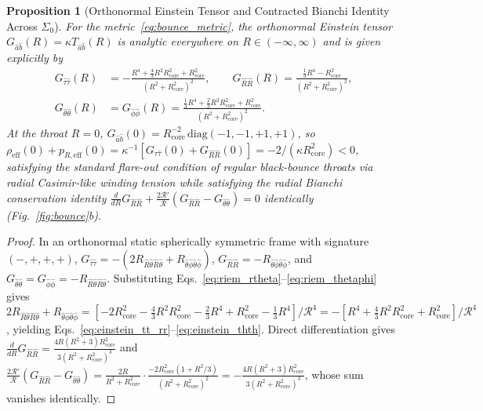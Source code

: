 \documentclass[pdflatex,sn-mathphys-num]{sn-jnl}
\theoremstyle{thmstyleone}
\newtheorem{proposition}[theorem]{Proposition}
\theoremstyle{thmstyletwo}
\theoremstyle{thmstylethree}
\begin{document}
\begin{proposition}[Orthonormal Einstein Tensor and Contracted Bianchi Identity Across $\Sigma_0$]\label{prop:bianchi}
For the metric~\eqref{eq:bounce_metric}, the orthonormal Einstein tensor $G_{\hat{a}\hat{b}}(R) = \kappa T_{\hat{a}\hat{b}}(R)$ is analytic everywhere on $R \in (-\infty,\infty)$ and is given explicitly by
\begin{align}
G_{\hat{\tau}\hat{\tau}}(R) &= -\frac{R^4 + \frac{4}{3}R^2 R_{\mathrm{core}}^2 + R_{\mathrm{core}}^2}{(R^2 + R_{\mathrm{core}}^2)^2}, \qquad
G_{\hat{R}\hat{R}}(R) = \frac{\frac{1}{3}R^4 - R_{\mathrm{core}}^2}{(R^2 + R_{\mathrm{core}}^2)^2}, \label{eq:einstein_tt_rr}\\
G_{\hat{\theta}\hat{\theta}}(R) &= G_{\hat{\phi}\hat{\phi}}(R) = \frac{\frac{1}{3}R^4 + \frac{2}{3}R^2 R_{\mathrm{core}}^2 + R_{\mathrm{core}}^2}{(R^2 + R_{\mathrm{core}}^2)^2}. \label{eq:einstein_thth}
\end{align}
At the throat $R=0$, $G_{\hat{a}\hat{b}}(0) = R_{\mathrm{core}}^{-2}\,\mathrm{diag}(-1, -1, +1, +1)$, so $\rho_{\mathrm{eff}}(0) + p_{R,\mathrm{eff}}(0) = \kappa^{-1}[G_{\hat{\tau}\hat{\tau}}(0) + G_{\hat{R}\hat{R}}(0)] = -2/(\kappa R_{\mathrm{core}}^2) < 0$, satisfying the standard flare-out condition of regular black-bounce throats \cite{MorrisThorne1988,SimpsonVisser2019} via radial Casimir-like winding tension while satisfying the radial Bianchi conservation identity $\frac{d}{dR}G_{\hat{R}\hat{R}} + \frac{2\mathcal{R}'}{\mathcal{R}}(G_{\hat{R}\hat{R}} - G_{\hat{\theta}\hat{\theta}}) = 0$ identically (Fig.~\ref{fig:bounce}b).
\end{proposition}

\begin{proof}
In an orthonormal static spherically symmetric frame with signature $(-,+,+,+)$, $G_{\hat{\tau}\hat{\tau}} = -(2R_{\hat{R}\hat{\theta}\hat{R}\hat{\theta}} + R_{\hat{\theta}\hat{\phi}\hat{\theta}\hat{\phi}})$, $G_{\hat{R}\hat{R}} = -R_{\hat{\theta}\hat{\phi}\hat{\theta}\hat{\phi}}$, and $G_{\hat{\theta}\hat{\theta}} = G_{\hat{\phi}\hat{\phi}} = -R_{\hat{R}\hat{\theta}\hat{R}\hat{\theta}}$. Substituting Eqs.~\eqref{eq:riem_rtheta}--\eqref{eq:riem_thetaphi} gives $2R_{\hat{R}\hat{\theta}\hat{R}\hat{\theta}} + R_{\hat{\theta}\hat{\phi}\hat{\theta}\hat{\phi}} = [-2R_{\mathrm{core}}^2 - \frac{4}{3}R^2 R_{\mathrm{core}}^2 - \frac{2}{3}R^4 + R_{\mathrm{core}}^2 - \frac{1}{3}R^4]/\mathcal{R}^4 = -[R^4 + \frac{4}{3}R^2 R_{\mathrm{core}}^2 + R_{\mathrm{core}}^2]/\mathcal{R}^4$, yielding Eqs.~\eqref{eq:einstein_tt_rr}--\eqref{eq:einstein_thth}. Direct differentiation gives $\frac{d}{dR}G_{\hat{R}\hat{R}} = \frac{4R(R^2 + 3)R_{\mathrm{core}}^2}{3(R^2 + R_{\mathrm{core}}^2)^3}$ and $\frac{2\mathcal{R}'}{\mathcal{R}}(G_{\hat{R}\hat{R}} - G_{\hat{\theta}\hat{\theta}}) = \frac{2R}{R^2 + R_{\mathrm{core}}^2}\cdot\frac{-2R_{\mathrm{core}}^2(1 + R^2/3)}{(R^2 + R_{\mathrm{core}}^2)^2} = -\frac{4R(R^2 + 3)R_{\mathrm{core}}^2}{3(R^2 + R_{\mathrm{core}}^2)^3}$, whose sum vanishes identically.
\end{proof}
\end{document}
